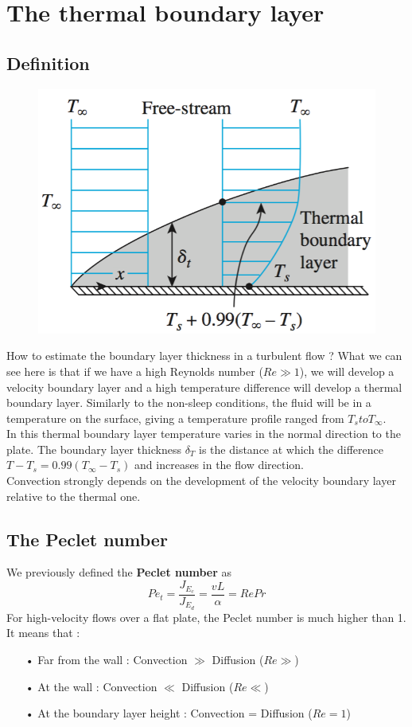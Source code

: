 \section{The thermal boundary layer}
\subsection{Definition}
	\begin{figure}
	\vspace{-5 mm}
	\includegraphics[scale=0.3]{ch5/7}
	\end{figure}			
	How to estimate the boundary layer thickness in a turbulent flow ? What we can see here is that if we have a high Reynolds number ($Re \gg 1$), we will develop a velocity boundary layer and a high temperature difference will develop a thermal boundary layer. Similarly to the non-sleep conditions, the fluid will be in a temperature on the surface, giving a temperature profile ranged from $T_s to T_\infty$. \\
In this thermal boundary layer temperature varies in the normal direction to the plate. The boundary layer thickness $\delta _T$ is the distance at which the difference $T-T_s = 0.99 (T_\infty -T_s)$ and increases in the flow direction. \\
Convection strongly depends on the development of the velocity boundary layer relative to the thermal one. 

\subsection{The Peclet number}
	We previously defined the \textbf{Peclet number} as 
	\begin{equation}
		Pe_t = \frac{J_{E_c}}{J_{E_d}} = \frac{vL}{\alpha} = RePr
	\end{equation}
	For high-velocity flows over a flat plate, the Peclet number is much higher than 1. It means that : 
	\begin{itemize}
		\item[•] Far from the wall : Convection $\gg$ Diffusion ($Re \gg$)
		\item[•] At the wall : Convection $\ll$ Diffusion ($Re \ll$)
		\item[•] At the boundary layer height : Convection = Diffusion ($Re = 1$)
	\end{itemize}
	
